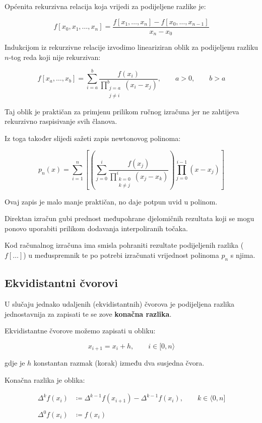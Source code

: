 Općenita rekurzivna relacija koja vrijedi za podijeljene razlike je:

$$
f[x_0, x_1, \dots, x_n] = \frac{f[x_1, \dots, x_n]- f[x_0, \dots, x_{n-1}]}{x_n - x_0}
$$

Indukcijom iz rekurzivne relacije izvodimo lineariziran oblik za podijeljenu razliku $n$-tog reda koji nije rekurzivan:

$$
f[x_a, \dots, x_b] = \sum_{i=a}^{b} \frac{f(x_i)}{\prod_{\substack{j=a\\j\neq i}}^b(x_i - x_j)},\qquad a>0,\qquad b>a
$$

Taj oblik je praktičan za primjenu prilikom ručnog izračuna jer ne zahtijeva rekurzivno raspisivanje svih članova.

Iz toga također slijedi sažeti zapis newtonovog polinoma:

$$
p_n(x) = \sum_{i=1}^{n}\left[\left(\sum_{j=0}^{i} \frac{f(x_j)}{\prod_{\substack{k=0\\k\neq j}}^i(x_j - x_k)}\right)\prod_{j=0}^{i-1}(x-x_j)\right]
$$

Ovaj zapis je malo manje praktičan, no daje potpun uvid u polinom.

\begin{warningbox}[međupohrana]
    Direktan izračun gubi prednost međupohrane djelomičnih rezultata koji se mogu ponovo uporabiti prilikom dodavanja interpoliranih točaka.

    Kod računalnog izračuna ima smisla pohraniti rezultate podijeljenih razlika ($f[\dots]$) u međuspremnik te po potrebi izračunati vrijednost polinoma $p_n$ s njima.
\end{warningbox}

\newpage

\subsection{Ekvidistantni čvorovi}

U slučaju jednako udaljenih (ekvidistantnih) čvorova je podijeljena razlika jednostavnija za zapisati te se zove \textbf{konačna razlika}.

Ekvidistantne čvorove možemo zapisati u obliku:

$$
x_{i+1}=x_i+h,\qquad i\in[0,n\rangle
$$

gdje je $h$ konstantan razmak (korak) između dva susjedna čvora.

Konačna razlika je oblika:

\begin{align}
\label{kon_razl}
\Delta^kf(x_i) &\coloneq \Delta^{k-1}f(x_{i+1}) - \Delta^{k-1}f(x_i),\qquad k\in\langle0,n]\\\nonumber\\
\Delta^0f(x_i) &\coloneq f(x_i)\nonumber
\end{align}

